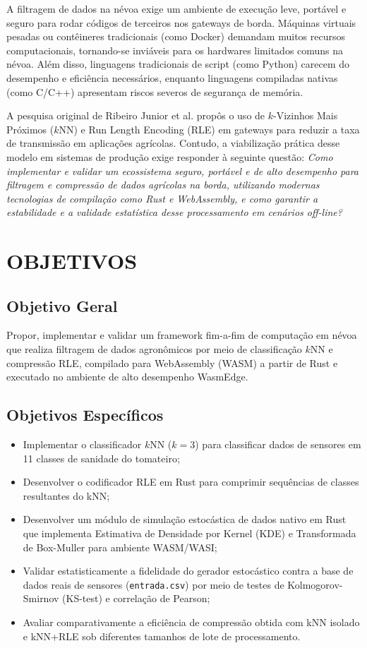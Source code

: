 \documentclass[
	12pt,
	openright,
	oneside,
	a4paper,
	english,
	brazil
	]{abntex2}
\begin{document}
A filtragem de dados na névoa exige um ambiente de execução leve, portável e seguro para rodar códigos de terceiros nos gateways de borda. Máquinas virtuais pesadas ou contêineres tradicionais (como Docker) demandam muitos recursos computacionais, tornando-se inviáveis para os hardwares limitados comuns na névoa. Além disso, linguagens tradicionais de script (como Python) carecem do desempenho e eficiência necessários, enquanto linguagens compiladas nativas (como C/C++) apresentam riscos severos de segurança de memória.

A pesquisa original de Ribeiro Junior et al. \cite{ribeiro2020nearest} propôs o uso de $k$-Vizinhos Mais Próximos ($k$NN) e Run Length Encoding (RLE) em gateways para reduzir a taxa de transmissão em aplicações agrícolas. Contudo, a viabilização prática desse modelo em sistemas de produção exige responder à seguinte questão: \textit{Como implementar e validar um ecossistema seguro, portável e de alto desempenho para filtragem e compressão de dados agrícolas na borda, utilizando modernas tecnologias de compilação como Rust e WebAssembly, e como garantir a estabilidade e a validade estatística desse processamento em cenários off-line?}

\section{OBJETIVOS}

\subsection{Objetivo Geral}

Propor, implementar e validar um framework fim-a-fim de computação em névoa que realiza filtragem de dados agronômicos por meio de classificação $k$NN e compressão RLE, compilado para WebAssembly (WASM) a partir de Rust e executado no ambiente de alto desempenho WasmEdge.

\subsection{Objetivos Específicos}

\begin{itemize}
    \item Implementar o classificador $k$NN ($k=3$) para classificar dados de sensores em 11 classes de sanidade do tomateiro;
    \item Desenvolver o codificador RLE em Rust para comprimir sequências de classes resultantes do kNN;
    \item Desenvolver um módulo de simulação estocástica de dados nativo em Rust que implementa Estimativa de Densidade por Kernel (KDE) e Transformada de Box-Muller para ambiente WASM/WASI;
    \item Validar estatisticamente a fidelidade do gerador estocástico contra a base de dados reais de sensores (\texttt{entrada.csv}) por meio de testes de Kolmogorov-Smirnov (KS-test) e correlação de Pearson;
    \item Avaliar comparativamente a eficiência de compressão obtida com kNN isolado e kNN+RLE sob diferentes tamanhos de lote de processamento.
\end{itemize}
\end{document}
